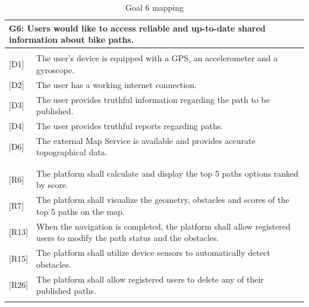 \begin{table}[H]
    \centering
    \renewcommand{\arraystretch}{1.5}
    
    \begin{tabularx}{\textwidth}{|l X|}
        \hline
        \multicolumn{2}{|p{\dimexpr\textwidth-2\tabcolsep}|}{\textbf{G6}:  Users would like to access reliable and up-to-date shared information about bike paths.} \\
        \hline
        & \\[-1em] %
        
        
        {[D1]} &  The user’s device is equipped with a GPS, an accelerometer and a gyroscope. \\
        {[D2]} & The user has a working internet connection. \\
        {[D3]} & The user provides truthful information regarding the path to be published. \\
        {[D4]} & The user provides truthful reports regarding paths. \\
        {[D6]} & The external Map Service is available and provides accurate topographical data.\\
        & \\
        \hline
        & \\[-1em]
        
        {[R6]} &  The platform shall calculate and display the top 5 paths options ranked by score. \\ 
        {[R7]} &  The platform shall visualize the geometry, obstacles and scores of the top 5 paths on the map.\\ 
        {[R13]} & When the navigation is completed, the platform shall allow registered users to modify the path status and the obstacles.\\ 
        {[R15]} &  The platform shall utilize device sensors to automatically detect obstacles.\\ 
        {[R26]} & The platform shall allow registered users to delete any of their published paths.\\ 
        
        & \\
        \hline
    \end{tabularx}
    \caption{Goal 6 mapping}
\end{table}

